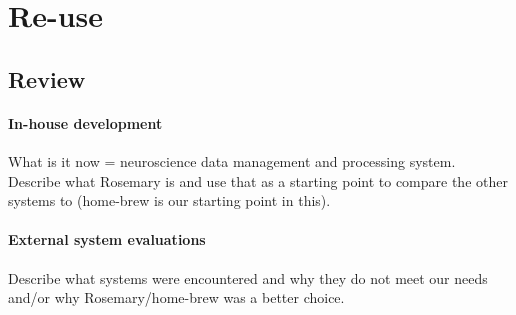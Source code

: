 \section{Re-use}

\subsection{Review}
\paragraph{In-house development}
What is it now = neuroscience data management and processing system.
Describe what Rosemary is and use that as a starting point to compare the other systems to (home-brew is our starting point in this).
\paragraph{External system evaluations}
Describe what systems were encountered and why they do not meet our needs and/or why Rosemary/home-brew was a better choice.